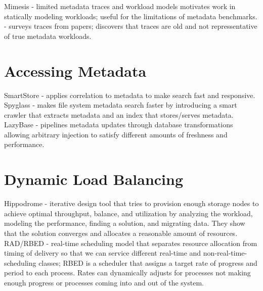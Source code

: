 \documentclass{article}
\begin{document}
\noindent\cite{abad:techreport2012-fstrace, abad:ucc2012-mimesis} Mimesis - limited metadata traces and workload models motivates work in statically modeling workloads; useful for the limitations of metadata benchmarks. \\

\noindent\cite{leung:atc2008-nfs-trace} - surveys traces from papers; discovers that traces are old and not repressentative of true metadata workloads. 

\section{Accessing Metadata}
\noindent\cite{hua:sc2009-smartstore} SmartStore - applies correlation to metadata to make search fast and responsive. \\

\noindent\cite{leung:fast2009-spyglass} Spyglass - makes file system metadata search faster by introducing a smart crawler that extracts metadata and an index that stores/serves metadata.\\

\noindent\cite{cipar:eurosys2012-lazybase} LazyBase - pipelines metadata updates through database transformations allowing arbitrary injection to satisfy different amounts of freshness and performance.\\

\section{Dynamic Load Balancing}

\noindent\cite{anderson:fast2001-hippodrome} Hippodrome - iterative design tool that tries to provision enough storage nodes to achieve optimal throughput, balance, and utilization by analyzing the workload, modeling the performance, finding a solution, and migrating data. They show that the solution converges and allocates a reasonable amount of resources.\\

\noindent\cite{brandt:rtss2003-rad} RAD/RBED - real-time scheduling model that separates resource allocation from timing of delivery so that we can service different real-time and non-real-time-scheduling classes; RBED is a scheduler that assigns a target rate of progress and period to each process. Rates can dynamically adjusts for processes not making enough progress or processes coming into and out of the system. \\
\end{document}
